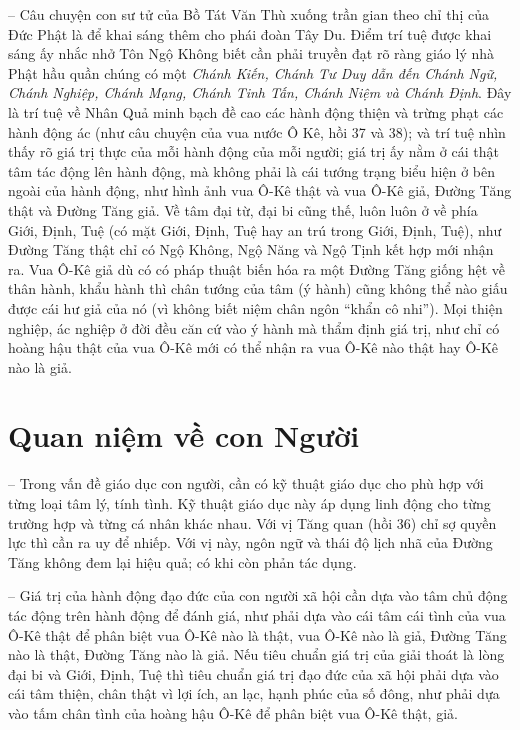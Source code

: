 -- Câu chuyện con sư tử của Bồ Tát Văn Thù xuống trần gian theo chỉ thị của Đức Phật là để khai sáng thêm cho phái đoàn Tây Du. Điểm trí tuệ được khai sáng ấy nhắc nhở Tôn Ngộ Không biết cần phải truyền đạt rõ ràng giáo lý nhà Phật hầu quần chúng có một \emph{Chánh Kiến, Chánh Tư Duy dẫn đến Chánh Ngữ, Chánh Nghiệp, Chánh Mạng, Chánh Tinh Tấn, Chánh Niệm và Chánh Định}. Đây là trí tuệ về Nhân Quả minh bạch đề cao các hành động thiện và trừng phạt các hành động ác (như câu chuyện của vua nước Ô Kê, hồi 37 và 38); và trí tuệ nhìn thấy rõ giá trị thực của mỗi hành động của mỗi người; giá trị ấy nằm ở cái thật tâm tác động lên hành động, mà không phải là cái tướng trạng biểu hiện ở bên ngoài của hành động, như hình ảnh vua Ô-Kê thật và vua Ô-Kê giả, Đường Tăng thật và Đường Tăng giả. Về tâm đại từ, đại bi cũng thế, luôn luôn ở về phía Giới, Định, Tuệ (có mặt Giới, Định, Tuệ hay an trú trong Giới, Định, Tuệ), như Đường Tăng thật chỉ có Ngộ Không, Ngộ Năng và Ngộ Tịnh kết hợp mới nhận ra. Vua Ô-Kê giả dù có có pháp thuật biến hóa ra một Đường Tăng giống hệt về thân hành, khẩu hành thì chân tướng của tâm (ý hành) cũng không thể nào giấu được cái hư giả của nó (vì không biết niệm chân ngôn ``khẩn cô nhi''). Mọi thiện nghiệp, ác nghiệp ở đời đều căn cứ vào ý hành mà thẩm định giá trị, như chỉ có hoàng hậu thật của vua Ô-Kê mới có thể nhận ra vua Ô-Kê nào thật hay Ô-Kê nào là giả.

\section{Quan niệm về con Người} %
\label{sec:36_37_con_nguoi}

-- Trong vấn đề giáo dục con người, cần có kỹ thuật giáo dục cho phù hợp với từng loại tâm lý, tính tình. Kỹ thuật giáo dục này áp dụng linh động cho từng trường hợp và từng cá nhân khác nhau. Với vị Tăng quan (hồi 36) chỉ sợ quyền lực thì cần ra uy để nhiếp. Với vị này, ngôn ngữ và thái độ lịch nhã của Đường Tăng không đem lại hiệu quả; có khi còn phản tác dụng.

-- Giá trị của hành động đạo đức của con người xã hội cần dựa vào tâm chủ động tác động trên hành động để đánh giá, như phải dựa vào cái tâm cái tình của vua Ô-Kê thật để phân biệt vua Ô-Kê nào là thật, vua Ô-Kê nào là giả, Đường Tăng nào là thật, Đường Tăng nào là giả. Nếu tiêu chuẩn giá trị của giải thoát là lòng đại bi và Giới, Định, Tuệ thì tiêu chuẩn giá trị đạo đức của xã hội phải dựa vào cái tâm thiện, chân thật vì lợi ích, an lạc, hạnh phúc của số đông, như phải dựa vào tấm chân tình của hoàng hậu Ô-Kê để phân biệt vua Ô-Kê thật, giả.

